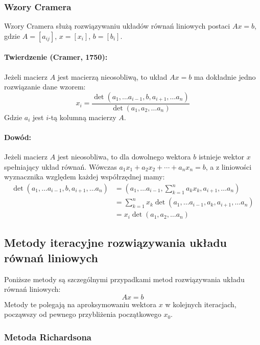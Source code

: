 \documentclass{article}
\begin{document}
\subsubsection{Wzory Cramera}
Wzory Cramera służą rozwiązywaniu układów równań liniowych postaci $Ax = b$, gdzie $A = [a_{ij}]$, $x = [x_i]$, $b = [b_i]$.
\paragraph{Twierdzenie (Cramer, 1750):} Jeżeli macierz $A$ jest macierzą nieosobliwą, to układ $Ax=b$ ma dokładnie jedno rozwiązanie dane wzorem:
\begin{equation}
x_i = \frac{\det (a_1, \dots a_{i-1}, b, a_{i+1}, \dots a_n)}{\det(a_1, a_2, \dots a_n)}
\end{equation}
Gdzie $a_i$ jest $i$-tą kolumną macierzy $A$.
\paragraph{Dowód:} Jeżeli macierz $A$ jest nieosobliwa, to dla dowolnego wektora $b$ istnieje wektor $x$ spełniający układ równań. Wówczas $a_1x_1 + a_2x_2 + \cdots + a_nx_n = b$, a z liniowości wyznacznika względem każdej współrzędnej mamy:
\begin{equation}
\begin{split}
\det (a_1, \dots a_{i-1}, b, a_{i+1}, \dots a_n) &= (a_1, \dots a_{i-1}, \sum_{k=1}^{n}a_kx_k, a_{i+1}, \dots a_n) \\
&= \sum_{k=1}^{n}x_k\det (a_1, \dots a_{i-1}, a_k, a_{i+1}, \dots a_n) \\
&= x_i \det(a_1, a_2, \dots a_n)
\end{split}
\end{equation}
\subsection{Metody iteracyjne rozwiązywania układu równań liniowych \label{sec:metodyiteracyjne}}

Poniższe metody są szczególnymi przypadkami metod rozwiązywania układu równań liniowych:
\begin{equation}
\label{eq:iter_main}
Ax = b
\end{equation}
Metody te polegają na aproksymowaniu wektora $x$ w kolejnych iteracjach, począwszy od pewnego przybliżenia początkowego $x_0$.

\subsubsection{Metoda Richardsona}
\end{document}
